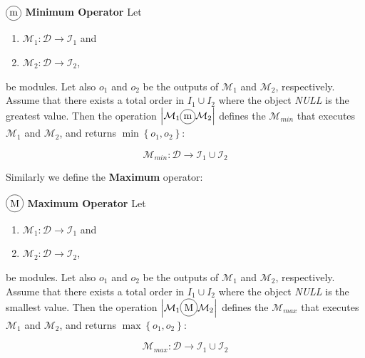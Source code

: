 \begin{definition}\label{op:min}
$\circled{m}$ {\bf Minimum Operator } Let
\begin{enumerate}%
	\item $\mathcal{M}_1 : \mathcal{D} \rightarrow \mathcal{I}_1$ and  
	\item $\mathcal{M}_2 : \mathcal{D} \rightarrow \mathcal{I}_2$,
\end{enumerate}%
be modules. %
Let also $o_1$ and $o_2$ be the outputs of $\mathcal{M}_1$ and $\mathcal{M}_2$, respectively. Assume that there exists a total order in $I_1 \cup I_2$ where the object \emph{NULL} is the greatest value. Then the operation $\left|\mathcal{M}_1\circled{m}\mathcal{M}_2\right|$ defines the \cm{} $\mathcal{M}_{min}$ that executes $\mathcal{M}_1$ and $\mathcal{M}_2$, and returns $\min\left\{o_1,o_2\right\}$:

\[
\mathcal{M}_{min}:\mathcal{D} \rightarrow \mathcal{I}_1 \cup \mathcal{I}_2 
\]
\end{definition}

\separation

Similarly we define the \textbf{Maximum} operator:

\begin{definition}\label{op:max}
$\circled{M}$ {\bf Maximum Operator} Let
\begin{enumerate}%
	\item $\mathcal{M}_1 : \mathcal{D} \rightarrow \mathcal{I}_1$ and  
	\item $\mathcal{M}_2 : \mathcal{D} \rightarrow \mathcal{I}_2$,
\end{enumerate}%
be modules. %
Let also $o_1$ and $o_2$ be the outputs of $\mathcal{M}_1$ and $\mathcal{M}_2$, respectively. Assume that there exists a total order in $I_1 \cup I_2$ where the object \emph{NULL} is the smallest value. Then the operation $\left|\mathcal{M}_1\circled{M}\mathcal{M}_2\right|$ defines the \cm{} $\mathcal{M}_{max}$ that executes $\mathcal{M}_1$ and $\mathcal{M}_2$, and returns $\max\left\{o_1,o_2\right\}$:

\[
\mathcal{M}_{max}:\mathcal{D} \rightarrow \mathcal{I}_1 \cup \mathcal{I}_2 
\]
\end{definition}

